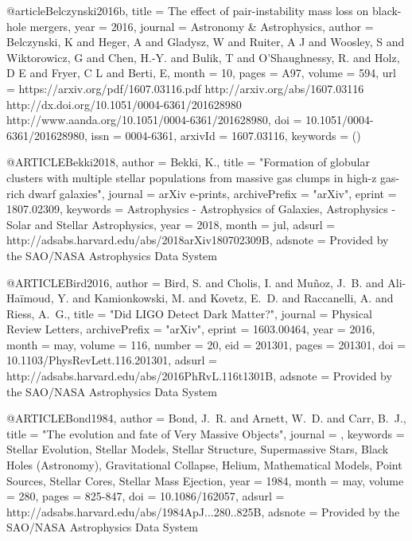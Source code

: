 \documentclass[twocolumn,tighten]{aastex63}
\begin{document}
{{{{{@article{Belczynski2016b,
    title = {{The effect of pair-instability mass loss on black-hole mergers}},
    year = {2016},
    journal = {Astronomy {\&} Astrophysics},
    author = {Belczynski, K and Heger, A and Gladysz, W and Ruiter, A J and Woosley, S and Wiktorowicz, G and Chen, H.-Y. and Bulik, T and O’Shaughnessy, R. and Holz, D E and Fryer, C L and Berti, E},
    month = {10},
    pages = {A97},
    volume = {594},
    url = {https://arxiv.org/pdf/1607.03116.pdf http://arxiv.org/abs/1607.03116 http://dx.doi.org/10.1051/0004-6361/201628980 http://www.aanda.org/10.1051/0004-6361/201628980},
    doi = {10.1051/0004-6361/201628980},
    issn = {0004-6361},
    arxivId = {1607.03116},
    keywords = {()}
}

@ARTICLE{Bekki2018,
   author = {{Bekki}, K.},
    title = "{Formation of globular clusters with multiple stellar populations from massive gas clumps in high-z gas-rich dwarf galaxies}",
  journal = {arXiv e-prints},
archivePrefix = "arXiv",
   eprint = {1807.02309},
 keywords = {Astrophysics - Astrophysics of Galaxies, Astrophysics - Solar and Stellar Astrophysics},
     year = 2018,
    month = jul,
   adsurl = {http://adsabs.harvard.edu/abs/2018arXiv180702309B},
  adsnote = {Provided by the SAO/NASA Astrophysics Data System}
}

@ARTICLE{Bird2016,
   author = {{Bird}, S. and {Cholis}, I. and {Mu{\~n}oz}, J.~B. and {Ali-Ha{\"i}moud}, Y. and 
	{Kamionkowski}, M. and {Kovetz}, E.~D. and {Raccanelli}, A. and 
	{Riess}, A.~G.},
    title = "{Did LIGO Detect Dark Matter?}",
  journal = {Physical Review Letters},
archivePrefix = "arXiv",
   eprint = {1603.00464},
     year = 2016,
    month = may,
   volume = 116,
   number = 20,
      eid = {201301},
    pages = {201301},
      doi = {10.1103/PhysRevLett.116.201301},
   adsurl = {http://adsabs.harvard.edu/abs/2016PhRvL.116t1301B},
  adsnote = {Provided by the SAO/NASA Astrophysics Data System}
}

@ARTICLE{Bond1984,
   author = {{Bond}, J.~R. and {Arnett}, W.~D. and {Carr}, B.~J.},
    title = "{The evolution and fate of Very Massive Objects}",
  journal = {\apj},
 keywords = {Stellar Evolution, Stellar Models, Stellar Structure, Supermassive Stars, Black Holes (Astronomy), Gravitational Collapse, Helium, Mathematical Models, Point Sources, Stellar Cores, Stellar Mass Ejection},
     year = 1984,
    month = may,
   volume = 280,
    pages = {825-847},
      doi = {10.1086/162057},
   adsurl = {http://adsabs.harvard.edu/abs/1984ApJ...280..825B},
  adsnote = {Provided by the SAO/NASA Astrophysics Data System}
}

}}}}}
\end{document}
